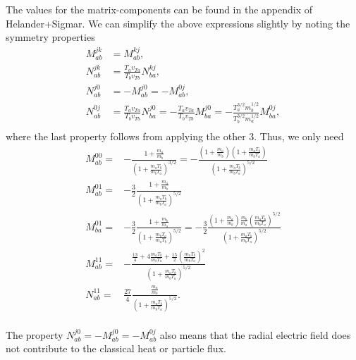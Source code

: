 \documentclass[12pt, a4paper]{article}
\begin{document}
The values for the matrix-components can be found in the appendix of Helander+Sigmar. We can simplify the above expressions slightly by noting the symmetry properties
\begin{align}
  M_{ab}^{jk} &= M_{ab}^{kj}, \\
  N_{ab}^{jk} &= \frac{T_a v_{Ta}}{T_b v_{Tb}} N_{ba}^{kj}, \\
  N_{ab}^{j0} &=-M_{ab}^{j0} = -M_{ab}^{0j},  \\
  N_{ab}^{0j} &= \frac{T_a v_{Ta}}{T_b v_{Tb}} N_{ba}^{j0} =-\frac{T_a v_{Ta}}{T_b v_{Tb}} M_{ba}^{j0}  =-\frac{T_a^{3/2} m_b^{1/2}}{T_b^{3/2} m_a^{1/2}} M_{ba}^{0j}, \\
\end{align}
where the last property follows from applying the other 3. Thus, we only need
\begin{align}
  M_{ab}^{00} =& - \frac{1+\frac{m_a}{m_b}}{\left(1+\frac{m_a T_b}{m_b T_a}\right)^{3/2}} = - \frac{\left(1+\frac{m_a}{m_b}\right)\left(1+\frac{m_a T_b}{m_b T_a}\right)}{\left(1+\frac{m_a T_b}{m_b T_a}\right)^{5/2}}\\
  M_{ab}^{01} =& - \frac{3}{2} \frac{1+\frac{m_a}{m_b}}{\left(1+\frac{m_a T_b}{m_b T_a}\right)^{5/2}} \\
  M_{ba}^{01} =& - \frac{3}{2} \frac{1+\frac{m_b}{m_a}}{\left(1+\frac{m_b T_a}{m_a T_b}\right)^{5/2}} =- \frac{3}{2} \frac{\left(1+\frac{m_a}{m_b}\right)\frac{m_b}{m_a}\left(\frac{m_a T_b}{m_b T_a}\right)^{5/2}}{\left(1+\frac{m_a T_b}{m_b T_a}\right)^{5/2}} \\
  M_{ab}^{11} =& - \frac{\frac{13}{4} + 4 \frac{m_a T_b}{m_b T_a} + \frac{15}{2}\left(\frac{m_a T_b}{m_b T_a}\right)^2 }{\left(1+\frac{m_a T_b}{m_b T_a}\right)^{5/2}} \\
  N_{ab}^{11} =& \frac{27}{4}  \frac{\frac{m_a}{m_b}}{\left(1+\frac{m_a T_b}{m_b T_a}\right)^{5/2}}. \\
\end{align}

The property $N_{ab}^{j0} =-M_{ab}^{j0} = -M_{ab}^{0j}$ also means that the radial electric field does not contribute to the classical heat or particle flux.
\end{document}
